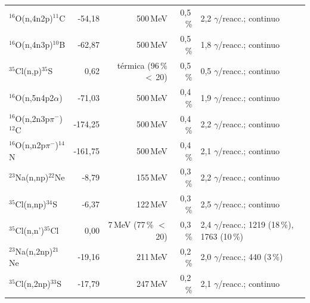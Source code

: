 \documentclass[11pt,a4paper]{article}
\begin{document}
{\begin{longtable}{p{4.4cm}rrrp{4.6cm}}
$^{16}$O(n,4n2p)$^{11}$C & -54,18 & 500\,MeV & 0,5\,\% & 2,2 $\gamma$/reacc.; continuo \\
$^{16}$O(n,4n3p)$^{10}$B & -62,87 & 500\,MeV & 0,5\,\% & 1,8 $\gamma$/reacc.; continuo \\
$^{35}$Cl(n,p)$^{35}$S & 0,62 & térmica (96\,\% $<$\,20) & 0,5\,\% & 0,5 $\gamma$/reacc.; continuo \\
$^{16}$O(n,5n4p2$\alpha$) & -71,03 & 500\,MeV & 0,4\,\% & 1,9 $\gamma$/reacc.; continuo \\
$^{16}$O(n,2n3p$\pi^-$)$^{12}$C & -174,25 & 500\,MeV & 0,4\,\% & 2,2 $\gamma$/reacc.; continuo \\
$^{16}$O(n,n2p$\pi^-$)$^{14}$N & -161,75 & 500\,MeV & 0,4\,\% & 2,1 $\gamma$/reacc.; continuo \\
$^{23}$Na(n,np)$^{22}$Ne & -8,79 & 155\,MeV & 0,3\,\% & 2,2 $\gamma$/reacc.; continuo \\
$^{35}$Cl(n,np)$^{34}$S & -6,37 & 122\,MeV & 0,3\,\% & 2,5 $\gamma$/reacc.; continuo \\
$^{35}$Cl(n,n')$^{35}$Cl & 0,00 & 7\,MeV (77\,\% $<$\,20) & 0,3\,\% & 2,4 $\gamma$/reacc.; 1219 (18\,\%), 1763 (10\,\%) \\
$^{23}$Na(n,2np)$^{21}$Ne & -19,16 & 211\,MeV & 0,2\,\% & 2,0 $\gamma$/reacc.; 440 (3\,\%) \\
$^{35}$Cl(n,2np)$^{33}$S & -17,79 & 247\,MeV & 0,2\,\% & 2,1 $\gamma$/reacc.; continuo \\
\bottomrule\end{longtable}}
\end{document}
